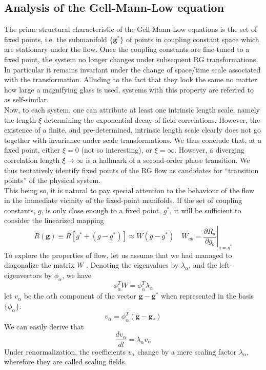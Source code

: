 \subsection{Analysis of the Gell-Mann-Low equation}
The prime structural characteristic of the Gell-Mann-Low equations is the set of fixed points, i.e. the submanifold $\{\bm{g}^*\}$ of points in coupling constant space which are stationary under the flow. 
Once the coupling constants are fine-tuned to a fixed point, the system no longer changes under subsequent RG transformations. In particular it remains invariant under the change of space/time scale associated with the transformation.
Alluding to the fact that they look the same no matter how large a magnifying glass is used, systems with this property are referred to as self-similar.
\\
Now, to each system, one can attribute at least one intrinsic length scale, namely the length $\xi$ determining the exponential decay of field correlations. 
However, the existence of a finite, and pre-determined, intrinsic length scale clearly does not go together with invariance under scale transformations. We thus conclude that, at a fixed point, either $\xi = 0$ (not so interesting), or $\xi = \infty$. 
However, a diverging correlation length $\xi \to \infty$ is a hallmark of a second-order phase transition. We thus tentatively identify fixed points of the RG flow as candidates for ``transition points'' of the physical system.
\\
This being so, it is natural to pay special attention to
the behaviour of the flow in the immediate vicinity of the fixed-point manifolds. If the set of coupling constants, $g$, is only close enough to a fixed point, $g^*$, it will be sufficient to consider the linearized mapping
\[R(\bm{g}) \equiv R[g^*+(g-g^*)] \approx W(g-g^*) \quad W_{ab} = \left. \frac{\partial R_a}{\partial g_b} \right|_{g=g^*}\]
To explore the properties of flow, let us assume that we had managed to diagonalize the matrix $W$ . Denoting the eigenvalues by $\lambda_{\alpha}$, and the left-eigenvectors by $\phi_{\alpha}$, we have
\[\phi_{\alpha}^T W = \phi_{\alpha}^T\lambda_{\alpha}\]
let $v_{\alpha}$ be the $\alpha$th component of the vector $\bm{g} - \bm{g}^*$ when represented in the basis $\{\phi_{\alpha}\}$:
\[v_{\alpha} = \phi_{\alpha}^T (\bm{g}-\bm{g}_{*})\]
We can easily derive that
\[\frac{dv_{\alpha}}{dl} = \lambda_{\alpha}v_{\alpha}\]
Under renormalization, the coefficients $v_{\alpha}$ change by a mere scaling factor $\lambda_{\alpha}$, wherefore they are called scaling fields.

